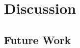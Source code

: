 \section{Discussion}
\label{sec:discussion}
\lipsum[2-3]

\subsection{Future Work}
\label{sec:futurework}
\lipsum[1]